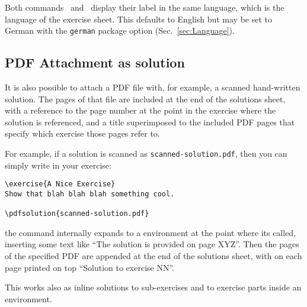 \documentclass[11pt,a4paper]{article}
\begin{document}

\begin{pkgnotice}
  Both commands~ and~ display their label in the same
  language, which is the language of the exercise sheet. This defaults to English but may
  be set to German with the {\tt german} package option (Sec.~\ref{sec:Language}).
\end{pkgnotice}




\subsection{PDF Attachment as solution}

It is also possible to attach a PDF file with, for example, a scanned hand-written
solution. The pages of that file are included at the end of the solutions sheet, with a
reference to the page number at the point in the exercise where the solution is
referenced, and a title superimposed to the included PDF pages that specify which exercise
those pages refer to.

For example, if a solution is scanned as \texttt{scanned-solution.pdf}, then you can
simply write in your exercise:
\begin{pkgverbatim}
\begin{verbatim}
\exercise{A Nice Exercise}
Show that blah blah blah something cool.

\pdfsolution{scanned-solution.pdf}

\end{verbatim}
\end{pkgverbatim}

the  command internally expands to a  environment
at the point where its called, inserting some text like ``The solution is provided on page
XYZ''. Then the pages of the specified PDF are appended at the end of the solutions sheet,
with on each page printed on top ``Solution to exercise NN''.

This works also as inline solutions to sub-exercises and to exercise parts inside an\\
 environment.
\end{document}
